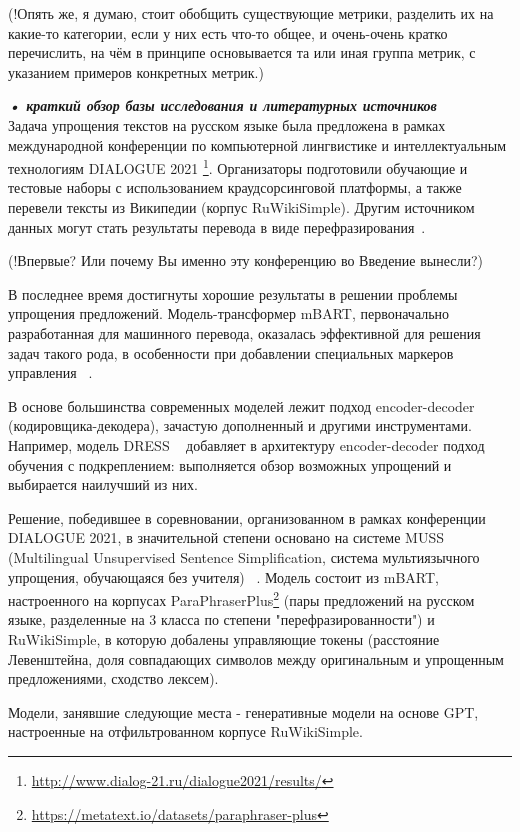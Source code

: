 (!Опять же, я думаю, стоит обобщить существующие метрики, разделить их на какие-то категории, если у них есть что-то общее, и очень-очень кратко перечислить, на чём в принципе основывается та или иная группа метрик, с указанием примеров конкретных метрик.)


\textbf{\textit{•	краткий обзор базы исследования и литературных источников}}\\



Задача упрощения текстов на русском языке была предложена в рамках международной конференции по компьютерной лингвистике и интеллектуальным технологиям DIALOGUE 2021 \footnote{\url{http://www.dialog-21.ru/dialogue2021/results/}}. Организаторы подготовили обучающие и тестовые наборы с использованием краудсорсинговой платформы, а также перевели тексты из Википедии (корпус RuWikiSimple). Другим источником данных могут стать результаты перевода в виде перефразирования~\cite{kazan_federal_university}. 

(!Впервые? Или почему Вы именно эту конференцию во Введение вынесли?)

В последнее время достигнуты хорошие результаты в решении проблемы упрощения предложений. Модель-трансформер mBART, первоначально разработанная для машинного перевода, оказалась эффективной для решения задач такого рода, в особенности при добавлении специальных маркеров управления ~\cite{martin_muss_2021}.

В основе большинства современных моделей лежит подход encoder-decoder (кодировщика-декодера), зачастую дополненный и другими инструментами. Например, модель DRESS ~\cite{fang_learning_2017} добавляет в архитектуру encoder-decoder подход обучения с подкреплением: выполняется обзор возможных упрощений и выбирается наилучший из них.
 
  Решение, победившее в соревновании, организованном в рамках конференции DIALOGUE 2021,  в значительной степени основано на системе MUSS (Multilingual Unsupervised Sentence Simplification, система мультиязычного упрощения, обучающаяся без учителя) ~\cite{martin_muss_2021}. Модель состоит из mBART, настроенного на корпусах ParaPhraserPlus\footnote{\url{https://metatext.io/datasets/paraphraser-plus}} (пары предложений на русском языке, разделенные на 3 класса по степени "перефразированности") и RuWikiSimple, в которую добалены управляющие токены (расстояние Левенштейна, доля совпадающих символов между оригинальным и упрощенным предложениями, сходство лексем).
 
 Модели, занявшие следующие места - генеративные модели на основе GPT, настроенные на отфильтрованном корпусе RuWikiSimple.
 
